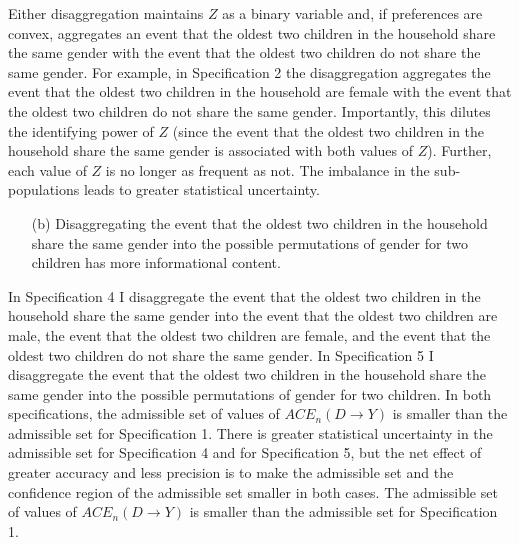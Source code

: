 \documentclass[12pt,a4paper,twoside]{article}
\numberwithin{equation}{section}
\begin{document}
Either disaggregation maintains $Z$ as a binary variable and, if preferences are convex, aggregates an event that the oldest two children in the household share the same gender with the event that the oldest two children do not share the same gender. For example, in Specification 2 the disaggregation aggregates the event that the oldest two children in the household are female with the event that the oldest two children do not share the same gender. Importantly, this dilutes the identifying power of $Z$ (since the event that the oldest two children in the household share the same gender is associated with both values of $Z$). Further, each value of $Z$ is no longer as frequent as not. The imbalance in the sub-populations leads to greater statistical uncertainty. 
\begin{enumerate}
\item[(b)] Disaggregating the event that the oldest two children in the household share the same gender into the possible permutations of gender for two children has more informational content.
\end{enumerate}
In Specification 4 I disaggregate the event that the oldest two children in the household share the same gender into the event that the oldest two children are male, the event that the oldest two children are female, and the event that the oldest two children do not share the same gender. In Specification 5 I disaggregate the event that the oldest two children in the household share the same gender into the possible permutations of gender for two children. In both specifications, the admissible set of values of $ACE_n(D\rightarrow Y)$ is smaller than the admissible set for Specification 1. There is greater statistical uncertainty in the admissible set for Specification 4 and for Specification 5, but the net effect of greater accuracy and less precision is to make the admissible set and the confidence region of the admissible set smaller in both cases. The admissible set of values of $ACE_n(D\rightarrow Y)$ is smaller than the admissible set for Specification 1. 
\end{document}
